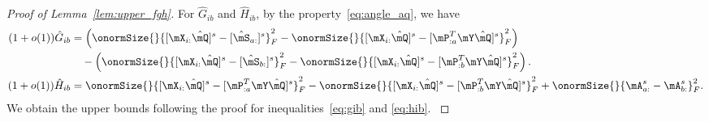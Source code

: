\documentclass[lettersize,onecolumn,journal]{IEEEtran}
\theoremstyle{definition}
\theoremstyle{definition}
\newcommand{\of}[1]{\left(#1\right)}
\begin{document}
\begin{proof}[Proof of Lemma~\ref{lem:upper_fgh}]
{For $\hat G_{ib}$ and $\hat H_{ib}$, by the property~\eqref{eq:angle_aq}, we have 
    \begin{align}
        (1+o(1))\hat G_{ib}& = \of{ \onormSize{}{[\mX_{i:}\hat \mQ]^s - [\hat \mS_{a:}]^s}_F^2 - \onormSize{}{ [\mX_{i:} \hat \mQ]^s - [\mP_{:a}^T \mY \hat \mQ ]^s }_F^2  } \\
        & \quad - \of{ \onormSize{}{[\mX_{i:} \hat \mQ]^s - [\hat \mS_{b:}]^s}_F^2 - \onormSize{}{ [\mX_{i:} \hat \mQ]^s - [\mP_{:b}^T \mY \hat \mQ ]^s }_F^2   }. \\
        (1+o(1))\hat H_{ib} & = \onormSize{}{ [\mX_{i:} \hat \mQ]^s - [\mP_{:a}^T \mY \hat \mQ ]^s }_F^2 - \onormSize{}{ [\mX_{i:} \hat \mQ]^s - [\mP_{:b}^T \mY \hat \mQ]^s }_F^2 + \onormSize{}{ \mA^s_{a:} -  \mA^s_{b:}  }_F^2.
    \end{align}
    We obtain the upper bounds following the proof for inequalities~\eqref{eq:gib} and \eqref{eq:hib}.
}


\end{proof}
\end{document}
